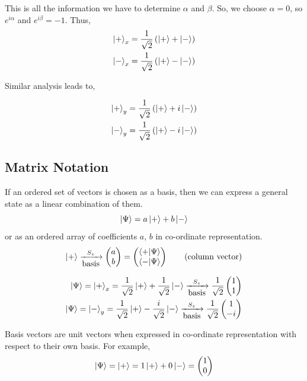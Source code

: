\documentclass[english, 11pt]{article}
\begin{document}
          This is all the information we have to determine $\alpha$ and $\beta$. So, we choose $\alpha = 0$, so $e^{i\alpha}$ and $e^{i\beta} =-1$. Thus,
          \begin{align*}
            \left|+\right\rangle_x & = \frac{1}{\sqrt{2}} \left( \left|+\right\rangle + \left|-\right\rangle \right) \\
            \left|-\right\rangle_x & = \frac{1}{\sqrt{2}} \left( \left|+\right\rangle - \left|-\right\rangle \right) \\
          \end{align*}

          Similar analysis leads to,

          \begin{align*}
            \left|+\right\rangle_y & = \frac{1}{\sqrt{2}} \left( \left|+\right\rangle + i\left|-\right\rangle \right) \\
            \left|-\right\rangle_y & = \frac{1}{\sqrt{2}} \left( \left|+\right\rangle - i\left|-\right\rangle \right) \\
          \end{align*}

          \subsection{Matrix Notation}

          If an ordered set of vectors is chosen as a basis, then we can express a general state as a linear combination of them.
          \[ \left|\Psi\right\rangle = a\left|+\right\rangle + b\left|-\right\rangle \]
          or as an ordered array of coefficients $a$, $b$ in co-ordinate representation.
          \begin{align*}
            \ket{+} \xrightarrow[\mbox{basis}]{S_z} \mtx{a \\ b} = \mtx{\braket{+}{\Psi} \\ \braket{-}{\Psi}} \ \ \ \ \ \ \mbox{(column vector)}
          \end{align*}

          \begin{align*}
            \left|\Psi\right\rangle = \left|+\right\rangle_x = \frac{1}{\sqrt{2}} \left|+\right\rangle + \frac{1}{\sqrt{2}}\left|-\right\rangle \xrightarrow[\mbox{basis}]{S_z} \frac{1}{\sqrt{2}} \left(\begin{matrix}1 \\ 1\end{matrix}\right) \\
            \left|\Psi\right\rangle = \left|-\right\rangle_y = \frac{1}{\sqrt{2}} \left|+\right\rangle - \frac{i}{\sqrt{2}}\left|-\right\rangle \xrightarrow[\mbox{basis}]{S_z} \frac{1}{\sqrt{2}} \left(\begin{matrix}1 \\ -i\end{matrix}\right)
          \end{align*}

          \begin{note}
            Basis vectors are unit vectors when expressed in co-ordinate representation with respect to their own basis. For example,
            \[ \left|\Psi\right\rangle = \left|+\right\rangle = 1\left|+\right\rangle + 0\left|-\right\rangle = \left(\begin{matrix}1\\0\end{matrix}\right) \]
          \end{note}
\end{document}
